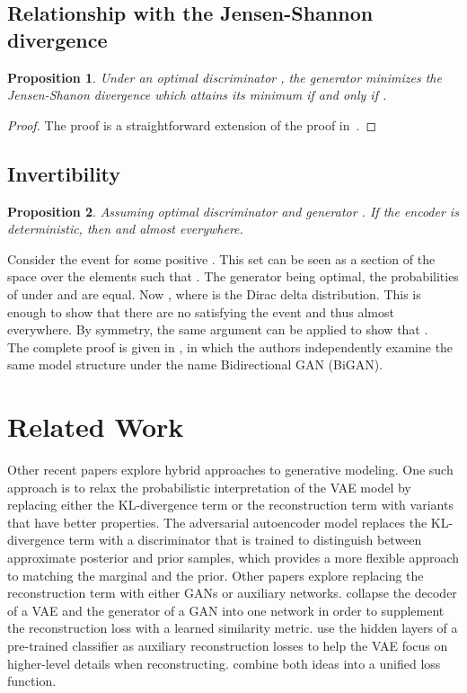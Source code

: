 \documentclass{article}
\newtheorem{prop}{Proposition}
\newenvironment{sketchproof}{\renewcommand{\proofname}{Sketch of proof}\proof}{\endproof}
\begin{document}
\subsection{Relationship with the Jensen-Shannon divergence}
\label{sec:jsd_rel}
\begin{prop}
	Under an optimal discriminator , the generator minimizes the
	Jensen-Shanon divergence which attains its minimum if and only if
	.
\end{prop}
\begin{proof}
	The proof is a straightforward extension of the proof
	in~\cite{goodfellow2014generative}.
\end{proof}

\subsection{Invertibility}
\label{sec:invertibility}
\begin{prop}
    Assuming optimal discriminator  and generator . If the encoder
     is deterministic, then  and
     almost everywhere.
\end{prop}
\begin{sketchproof}
    Consider the event  for some positive . This
    set can be seen as a section of the  space 	over the
    elements  such that . The generator being
    optimal, the probabilities of  under  and
     are equal.  Now , where  is the Dirac delta distribution.  This is enough
    to show that there are no  satisfying the event  and thus
     almost everywhere.  By symmetry, the same argument
    can be applied to show that . \\ The complete
    proof is given in \citep{donahue2016adversarial}, in which the authors
    independently examine the same model structure under the name Bidirectional
    GAN (BiGAN).
\end{sketchproof}

\section{Related Work}

Other recent papers explore hybrid approaches to generative modeling. One such
approach is to relax the probabilistic interpretation of the VAE model by
replacing either the KL-divergence term or the reconstruction term with
variants that have better properties. The adversarial autoencoder model
\citep{makhzani2015adversarial} replaces the KL-divergence term with a
discriminator that is trained to distinguish between approximate posterior and
prior samples, which provides a more flexible approach to matching the marginal
 and the prior. Other papers explore replacing the reconstruction
term with either GANs or auxiliary networks. \citet{larsen2015autoencoding}
collapse the decoder of a VAE and the generator of a GAN into one network in
order to supplement the reconstruction loss with a learned similarity metric.
\citet{lamb2016discriminative} use the hidden layers of a pre-trained
classifier as auxiliary reconstruction losses to help the VAE focus on
higher-level details when reconstructing. \citet{dosovitskiy2016generating}
combine both ideas into a unified loss function.
\end{document}
